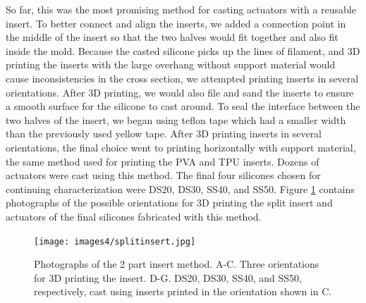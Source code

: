 So far, this was the most promising method for casting actuators with a reusable insert. To better connect and align the inserts, we added a connection point in the middle of the insert so that the two halves would fit together and also fit inside the mold. Because the casted silicone picks up the lines of filament, and 3D printing the inserts with the large overhang without support material would cause inconsistencies in the cross section, we attempted printing inserts in several orientations. After 3D printing, we would also file and sand the inserts to ensure a smooth surface for the silicone to cast around. To seal the interface between the two halves of the insert, we began using teflon tape which had a smaller width than the previously used yellow tape. After 3D printing inserts in several orientations, the final choice went to printing horizontally with support material, the same method used for printing the PVA and TPU inserts. Dozens of actuators were cast using this method. The final four silicones chosen for continuing characterization were DS20, DS30, SS40, and SS50. Figure \ref{fig:splitinsert} contains photographs of the possible orientations for 3D printing the split insert and actuators of the final silicones fabricated with this method. 

\begin{figure}[h]
    \centering
    \texttt{[image: images4/splitinsert.jpg]}
    \caption{Photographs of the 2 part insert method. A-C. Three orientations for 3D printing the insert. D-G. DS20, DS30, SS40, and SS50, respectively, cast using inserts printed in the orientation shown in C.}
    \label{fig:splitinsert}
\end{figure}

